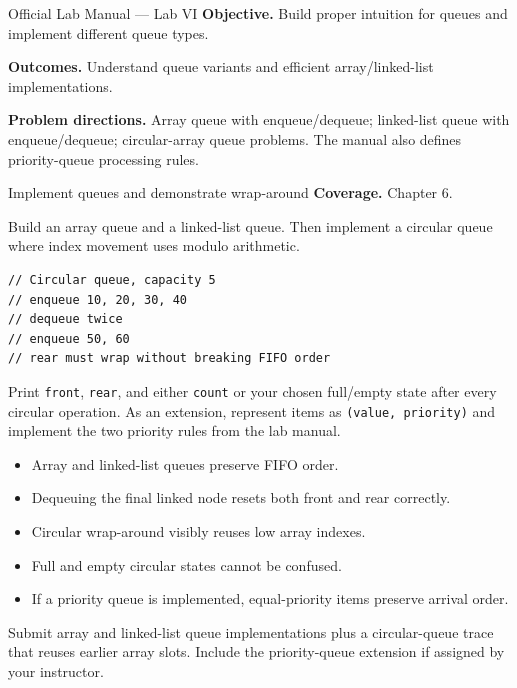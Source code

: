 
\begin{sourcealignment}{Official Lab Manual --- Lab VI}
\textbf{Objective.} Build proper intuition for queues and implement different queue types.

\textbf{Outcomes.} Understand queue variants and efficient array/linked-list implementations.

\textbf{Problem directions.} Array queue with enqueue/dequeue; linked-list queue with enqueue/dequeue; circular-array queue problems. The manual also defines priority-queue processing rules.
\end{sourcealignment}

\begin{labproject}{Implement queues and demonstrate wrap-around}
\textbf{Coverage.} Chapter 6.

Build an array queue and a linked-list queue. Then implement a circular queue where index movement uses modulo arithmetic.

\begin{lstlisting}
// Circular queue, capacity 5
// enqueue 10, 20, 30, 40
// dequeue twice
// enqueue 50, 60
// rear must wrap without breaking FIFO order
\end{lstlisting}

\begin{tryit}
Print \texttt{front}, \texttt{rear}, and either \texttt{count} or your chosen full/empty state after every circular operation. As an extension, represent items as \texttt{(value, priority)} and implement the two priority rules from the lab manual.
\end{tryit}
\end{labproject}

\begin{verification}
\begin{itemize}
  \item Array and linked-list queues preserve FIFO order.
  \item Dequeuing the final linked node resets both front and rear correctly.
  \item Circular wrap-around visibly reuses low array indexes.
  \item Full and empty circular states cannot be confused.
  \item If a priority queue is implemented, equal-priority items preserve arrival order.
\end{itemize}
\end{verification}

\begin{labdeliverable}
Submit array and linked-list queue implementations plus a circular-queue trace that reuses earlier array slots. Include the priority-queue extension if assigned by your instructor.
\end{labdeliverable}
